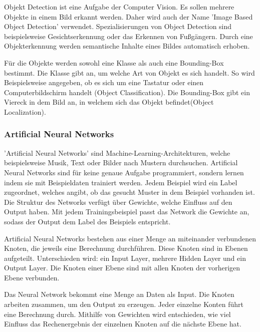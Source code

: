 Objekt Detection ist eine Aufgabe der Computer Vision. Es sollen mehrere Objekte in einem Bild erkannt werden. Daher wird auch der Name 'Image Based Object Detection' verwendet. Spezialisierungen von Object Detection sind beispielsweise Gesichtserkennung oder das Erkennen von Fußgängern. Durch eine Objekterkennung werden semantische Inhalte eines Bildes automatisch erhoben. 

Für die Objekte werden sowohl eine Klasse als auch eine Bounding-Box bestimmt. Die Klasse gibt an, um welche Art von Objekt es sich handelt. So wird Beispielsweise angegeben, ob es sich um eine Tastatur oder einen Computerbildschirm handelt (Object Classification). Die Bounding-Box gibt ein Viereck in dem Bild an, in welchem sich das Objekt befindet(Object Localization). \citep{objectdetection,objectDetectionReview}



\subsubsection{Artificial Neural Networks}
'Artificial Neural Networks' sind Machine-Learning-Architekturen, welche beispielsweise Musik, Text oder Bilder nach Mustern durchsuchen. Artificial Neural Networks sind für keine genaue Aufgabe programmiert, sondern lernen indem sie mit Beispieldaten trainiert werden. Jedem Beispiel wird ein Label zugeordnet, welches angibt, ob das gesucht Muster in dem Beispiel vorhanden ist. Die Struktur des Networks verfügt über Gewichte, welche Einfluss auf den Output haben. Mit jedem Trainingsbeispiel passt das Network die Gewichte an, sodass der Output dem Label des Beispiels entspricht.\citep{introToCNN,surveyOfDeepLearing}

Artificial Neural Networks bestehen aus einer Menge an miteinander verbundenen Knoten, die jeweils eine Berechnung durchführen. Diese Knoten sind in Ebenen aufgeteilt. Unterschieden wird: ein Input Layer, mehrere Hidden Layer und ein Output Layer. Die Knoten einer Ebene sind mit allen Knoten der vorherigen Ebene verbunden.\citep{introToCNN,surveyOfDeepLearing}

Das Neural Network bekommt eine Menge an Daten als Input. Die Knoten arbeiten zusammen, um den Output zu erzeugen. Jeder einzelne Konten führt eine Berechnung durch. Mithilfe von Gewichten wird entschieden, wie viel Einfluss das Rechenergebnis der einzelnen Knoten auf die nächste Ebene hat.\citep{introToCNN,surveyOfDeepLearing}

